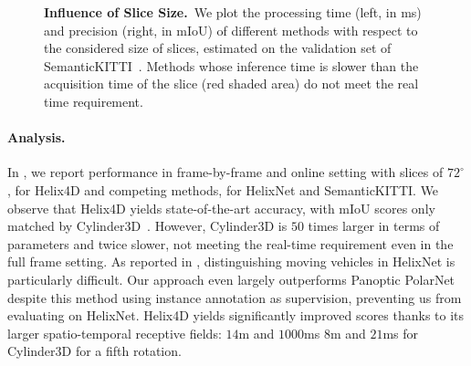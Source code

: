 \documentclass[runningheads]{tpls/llncs}
\begin{document}
\begin{figure}[t]
 	\caption{{\bf Influence of Slice Size.}~{We plot the processing time (left, in ms) and precision (right, in mIoU) of different methods with respect to the considered size of slices, estimated on the validation set of SemanticKITTI~\cite{behley2019iccv}. 
	Methods whose inference time is slower than the acquisition time of the slice (red shaded area) do not meet the real time requirement.
	}}
    \label{fig:main}
\end{figure}

\paragraph{Analysis.}
In , we report performance in frame-by-frame and online setting with slices of $72^\circ$, for Helix4D and competing methods, for HelixNet and SemanticKITTI. 
We observe that Helix4D yields state-of-the-art accuracy, with mIoU scores only matched by Cylinder3D~\cite{zhu2021cylindrical}. However, Cylinder3D is $50$ times larger in terms of parameters and twice slower, not meeting the real-time requirement even in the full frame setting. As reported in , 
distinguishing moving vehicles in HelixNet is particularly difficult. Our approach even largely outperforms Panoptic PolarNet despite this method using instance annotation as supervision, preventing us from evaluating on HelixNet. Helix4D yields significantly improved scores thanks to its larger spatio-temporal receptive fields: $14$m and $1000$ms \vs $8$m and $21$ms for Cylinder3D for a fifth rotation.
\end{document}
